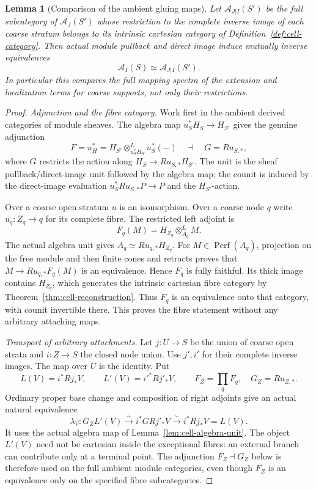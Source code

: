 \documentclass[11pt]{article}
\newtheorem{lemma}[theorem]{Lemma}
\theoremstyle{definition}
\theoremstyle{remark}
\newcommand{\Perf}{\operatorname{Perf}}
\begin{document}
\begin{lemma}[Comparison of the ambient gluing maps]
\label{lem:fibre-cartesian-ambient}
Let $\mathcal A_{J|I}(S')$ be the full subcategory of
$\mathcal A_J(S')$ whose restriction to the complete inverse image
of each coarse stratum belongs to its intrinsic cartesian category
of Definition~\ref{def:cell-category}.  Then actual module pullback
and direct image induce mutually inverse equivalences
\[
 \mathcal A_I(S)\simeq\mathcal A_{J|I}(S').
\]
In particular this compares the full mapping spectra of the extension
and localization terms for coarse supports, not only their restrictions.
\end{lemma}
\begin{proof}
\emph{Adjunction and the fibre category.}
Work first in the ambient derived categories of module sheaves.  The
algebra map $u_S^*H_S\to H_{S'}$ gives the genuine adjunction
\[
 F=u_H^*=H_{S'}\otimes^L_{u_S^*H_S}u_S^*(-)
 \quad\dashv\quad
 G=Ru_{S,*},
\]
where $G$ restricts the action along $H_S\to Ru_{S,*}H_{S'}$.
The unit is the sheaf pullback/direct-image unit followed by the
algebra map; the counit is induced by the direct-image evaluation
$u_S^*Ru_{S,*}P\to P$ and the $H_{S'}$-action.

Over a coarse open stratum $u$ is an isomorphism.  Over a coarse node
$q$ write $u_q:Z_q\to q$ for its complete fibre.  The restricted left
adjoint is
\[
 F_q(M)=H_{Z_q}\otimes^L_{A_q}M.
\]
The actual algebra unit gives $A_q\simeq Ru_{q,*}H_{Z_q}$.
For $M\in\Perf(A_q)$, projection on the free module and then finite
cones and retracts proves that $M\to Ru_{q,*}F_q(M)$ is an
equivalence.  Hence $F_q$ is fully faithful.  Its thick image
contains $H_{Z_q}$, which generates the intrinsic cartesian fibre
category by Theorem~\ref{thm:cell-reconstruction}.  Thus $F_q$ is
an equivalence onto that category, with counit invertible there.
This proves the fibre statement without any arbitrary attaching maps.

\emph{Transport of arbitrary attachments.}
Let $j:U\to S$ be the union of coarse open strata and $i:Z\to S$
the closed node union.  Use $j',i'$ for their complete inverse images.
The map over $U$ is the identity.  Put
\[
 L(V)=i^*Rj_*V,\qquad L'(V)=i'^*Rj'_*V,\qquad
 F_Z=\prod_q F_q,\quad G_Z=Ru_{Z,*}.
\]
Ordinary proper base change and composition of right adjoints give
an actual natural equivalence
\[
 \lambda_V:G_ZL'(V)\xrightarrow{\sim}i^*G Rj'_*V
                    \xrightarrow{\sim}i^*Rj_*V=L(V).
\]
It uses the actual algebra map of Lemma~\ref{lem:cell-algebra-unit}.
The object $L'(V)$ need not be cartesian inside the exceptional
fibres: an external branch can contribute only at a terminal point.
The adjunction $F_Z\dashv G_Z$ below is therefore used on the full
ambient module categories, even though $F_Z$ is an equivalence only
on the specified fibre subcategories.


\end{proof}
\end{document}
